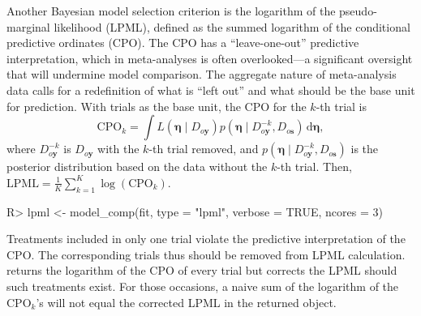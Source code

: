 Another Bayesian model selection criterion is the logarithm of the pseudo-marginal likelihood (LPML), defined as the summed logarithm of the conditional predictive ordinates (CPO). The CPO has a ``leave-one-out'' predictive interpretation, which in meta-analyses is often overlooked---a significant oversight that will undermine model comparison. The aggregate nature of meta-analysis data calls for a redefinition of what is ``left out'' and what should be the base unit for prediction. With trials as the base unit, the CPO for the $k$-th trial is
\[
  \mathrm{CPO}_k = \int L(\bm{\eta}\mid D_{o\mathbf{y}})p(\bm{\eta}\mid D_{o\mathbf{y}}^{-k},D_{o\mathbf{s}})\,\mathrm{d}\bm{\eta},
\]
where $D_{o\mathbf{y}}^{-k}$ is $D_{o\mathbf{y}}$ with the $k$-th trial removed, and $p(\bm{\eta}\mid D_{o\mathbf{y}}^{-k},D_{o\mathbf{s}})$ is the posterior distribution based on the data without the $k$-th trial. Then, $\mathrm{LPML} = \frac{1}{K}\sum_{k=1}^K \log (\mathrm{CPO}_k)$.
\begin{example}
R> lpml <- model_comp(fit, type = "lpml", verbose = TRUE, ncores = 3)
\end{example}
Treatments included in only one trial violate the predictive interpretation of the CPO. The corresponding trials thus should be removed from LPML calculation.  returns the logarithm of the CPO of every trial but corrects the LPML should such treatments exist. For those occasions, a naive sum of the logarithm of the $\mathrm{CPO}_k$'s will not equal the corrected LPML in the returned object.

